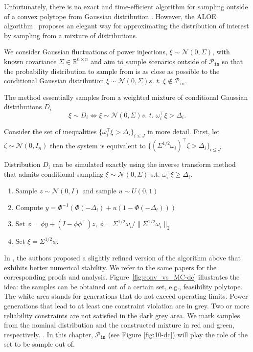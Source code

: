 Unfortunately, there is no exact and time-efficient algorithm for sampling outside of a convex polytope from Gaussian distribution \cite{khachiyan1993complexity}. However, the ALOE algorithm~\cite{owen2019importance,lukashevich2021power} proposes an elegant way for approximating the distribution of interest by sampling from a mixture of distributions. 

We consider Gaussian fluctuations of power injections, $\xi \sim \mathcal{N}(0, \Sigma)$, with known covariance $\Sigma \in \mathbb{R}^{n\times n}$ and aim to sample scenarios outside of $\mathcal{P}_{\texttt{in}}$ so that the probability distribution to sample from is as close as possible to the conditional Gaussian distribution $\xi \sim \mathcal{N}(0, \Sigma) \textit{s. t. } \xi\not\in \mathcal{P}_{\texttt{in}}$. 

The method essentially samples from a weighted mixture of conditional Gaussian distributions $D_i$ 
\[\xi \sim D_i \Longleftrightarrow \xi \sim \mathcal{N}(0, \Sigma) \textit{s. t. } \omega_i^\top \xi > \Delta_i. \]

Consider the set of inequalities $\{\omega_i^\top \xi > \Delta_i\}_{i\le J}$ in more detail. First, let $\zeta \sim \mathcal{N}(0, I_n)$ then the system is equivalent to $\{(\Sigma^{1/2}\omega_i)^\top 
\zeta > \Delta_i\}_{i\le J}$. 


Distribution $D_i$ can be simulated exactly using the inverse transform method \cite{l2009monte,morlet1983sampling} that admits conditional sampling $\xi \sim \mathcal{N}(0, \Sigma)$ s.t. $\omega_i^\top \xi \ge \Delta_i$. 
\begin{enumerate}
  \item Sample $z \sim \mathcal{N}(0, I)$ and sample $u \sim U(0,1)$
  \item Compute $y = \Phi^{-1}(\Phi(-\Delta_i) + u(1 - \Phi(-\Delta_i)))$
  \item Set $\phi = \phi y + (I - \phi\phi^\top) z$, $\phi = \Sigma^{1/2} \omega_i / \|\Sigma^{1/2} \omega_i\|_2$
  \item Set $\xi = \Sigma^{1/2} \phi$.
\end{enumerate}

In \cite{owen2019importance,lukashevich2021power}, the authors proposed a slightly refined version of the algorithm above that exhibits better numerical stability. We refer to the same papers for the corresponding proofs and analysis. Figure~\ref{fig:conv_vs_MC-dc} illustrates the idea: the samples can be obtained out of a certain set, e.g., feasibility polytope. The white area stands for generations that do not exceed operating limits. Power generations that lead to at least one constraint violation are in grey. Two or more reliability constraints are not satisfied in the dark grey area. We mark samples from the nominal distribution and the constructed mixture in red and green, respectively. \cite{lukashevich2021power}. In this chapter, $\mathcal{P}_{\texttt{in}}$ (see Figure \ref{fig:10-dc}) will play the role of the set to be sample out of.


